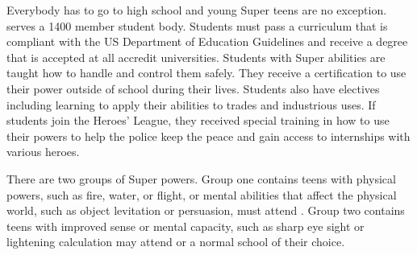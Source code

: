 \documentclass[blue]{LRSguildcamp1}
\begin{document}
\name{\bTest{}}

Everybody has to go to high school and young Super teens are no exception. \pSuperSchool{} serves a 1400 member student body. Students must pass a curriculum that is compliant with the US Department of Education Guidelines and receive a degree that is accepted at all accredit universities. Students with Super abilities are taught how to handle and control them safely. They receive a certification to use their power outside of school during their lives. Students also have electives including learning to apply their abilities to trades and industrious uses.  If students join the Heroes' League, they received special training in how to use their powers to help the police keep the peace and gain access to internships with various heroes. 

There are two groups of Super powers. Group one contains teens with physical powers, such as fire, water, or flight, or mental abilities that affect the physical world, such as object levitation or persuasion, must attend \pSuperShool{}. Group two contains teens with improved sense or mental capacity, such as sharp eye sight or lightening calculation may attend \pSuperSchool{} or a normal school of their choice.  
\end{document}
